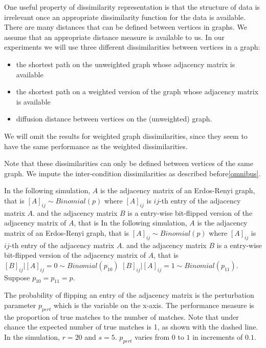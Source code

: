 \documentclass[11pt]{article} %
\begin{document}
One useful property of dissimilarity representation is that the structure of data is irrelevant once an appropriate dissimilarity function  for the data is available. 
There are many distances that can be defined between vertices in graphs. We assume that an appropriate distance measure is available to us.
In our experiments we will use three different dissimilarities between vertices in a graph:
\begin{itemize}
 \item the shortest path on the  unweighted graph whose adjacency matrix is available
 \item the shortest path on a weighted version of the graph whose adjacency matrix is available
 \item diffusion distance between vertices on the (unweighted) graph.
 \end{itemize}
 We will omit the results for weighted graph dissimilarities, since they seem to have the same performance as the weighted dissimilarities.
 
 Note that these dissimilarities can only be defined between vertices of the same graph. We impute the inter-condition dissimilarities   as described before\ref{omnibus}.
 
  In the following simulation, $A$ is the adjacency matrix of an Erdos-Renyi graph, that is
  $\left[A\right]_{ij} \sim Binomial(p)$ where $\left[A\right]_{ij}$ is $ij$-th entry of the adjacency matrix  $A$.
   and the adjacency matrix  $B$ is a entry-wise bit-flipped version of the adjacency matrix of $A$, that is
   In the following simulation, $A$ is the adjacency matrix of an Erdos-Renyi graph, that is
  $\left[A\right]_{ij} \sim Binomial(p)$ where $\left[A\right]_{ij}$ is $ij$-th entry of the adjacency matrix  $A$.
   and the adjacency matrix  $B$ is a entry-wise bit-flipped version of the adjacency matrix of $A$, that is
   $\left[B\right]_{ij}|\left[A\right]_{ij}=0 \sim Binomial(p_{10})$ $\left[B\right]_{ij}|\left[A\right]_{ij}=1 \sim Binomial(p_{11})$. Suppose $p_{10}=p_{11}=p$.
  
  The probability of flipping an entry of the adjacency matrix is the perturbation parameter $p_{pert}$ which is the variable on the x-axis. 
  The performance measure is the proportion of true matches to the number of matches. Note that 
  under chance the expected number of true matches is 1, as shown with the dashed line. In the simulation, $r=20$ and $s=5$. $p_{pert}$ varies from $0$ to $1$ in increments of $0.1$. 
  
\end{document}
